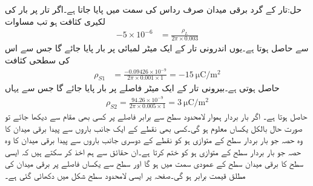 حل:تار کے گرد برقی میدان صرف رداس کی سمت میں پایا جاتا ہے۔اگر تار پر بار کی لکیری کثافت  ہو تب مساوات
\begin{align*}
-5 \times 10^{-6}&=\frac{\rho_L}{2 \pi  \times 0.003}
\end{align*}
سے  حاصل ہوتا ہے۔یوں اندرونی تار کے ایک میٹر لمبائی پر  بار پایا جائے گا جس سے اس کی سطحی کثافت
\begin{align*}
\rho_{S1}&=\frac{-0.09426 \times 10^{-9}}{2\pi \times 0.001 \times 1}=\SI{-15}{\micro \coulomb \per \meter \squared}
\end{align*}
حاصل ہوتی ہے۔بیرونی تار کے ایک میٹر فاصلے پر  بار پایا جائے گا جس سے یہاں
\begin{align*}
\rho_{S2}=\frac{94.26 \times 10^{-9}}{2\pi \times 0.005 \times 1}=\SI{3}{\micro \coulomb \per \meter \squared}
\end{align*}
حاصل ہوتا ہے۔
اگر بار بردار ہموار لامحدود سطح  سے برابر فاصلے پر کسی بھی  مقام سے دیکھا جائے تو صورت حال بالکل یکساں معلوم ہو گی۔کسی بھی نقطے کے ایک جانب باروں سے پیدا برقی میدان کا وہ حصہ جو بار بردار سطح  کے متوازی ہو کو نقطے کے دوسری جانب باروں سے پیدا برقی میدان کا وہ حصہ جو بار بردار سطح  کے متوازی ہو کو ختم کرتا ہے۔ان حقائق سے ہم اخذ کر سکتے ہیں کہ ایسی سطح کا برقی میدان سطح کے عمودی سمت میں ہو گا اور سطح سے یکساں فاصلے پر برقی میدان کی مطلق قیمت برابر ہو گی۔صفحہ  پر ایسی لامحدود سطح شکل  میں دکھائی گئی ہے۔


